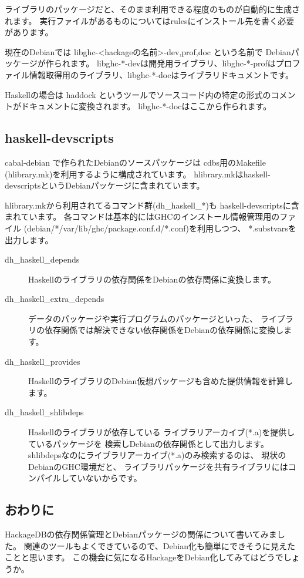 ライブラリのパッケージだと、そのまま利用できる程度のものが自動的に生成されます。
実行ファイルがあるものについてはrulesにインストール先を書く必要があります。

現在のDebianでは libghc-<hackageの名前>-{dev,prof,doc} という名前で Debianパッケージが作られます。
libghc-*-devは開発用ライブラリ、libghc-*-profはプロファイル情報取得用のライブラリ、libghc-*-docはライブラリドキュメントです。

Haskellの場合は haddock というツールでソースコード内の特定の形式のコメントがドキュメントに変換されます。
libghc-*-docはここから作られます。


\subsection{haskell-devscripts}

cabal-debian で作られたDebianのソースパッケージは
cdbs用のMakefile (hlibrary.mk)を利用するように構成されています。
hlibrary.mkはhaskell-devscriptsというDebianパッケージに含まれています。


hlibrary.mkから利用されてるコマンド群(dh\_haskell\_*)も
haskell-devscriptsに含まれています。
各コマンドは基本的にはGHCのインストール情報管理用のファイル
(debian/*/var/lib/ghc/package.conf.d/*.conf)を利用しつつ、
*.substvarsを出力します。

\begin{description}
\item[dh\_haskell\_depends]
Haskellのライブラリの依存関係をDebianの依存関係に変換します。
\item[dh\_haskell\_extra\_depends]
データのパッケージや実行プログラムのパッケージといった、
ライブラリの依存関係では解決できない依存関係をDebianの依存関係に変換します。
\item[dh\_haskell\_provides]
HaskellのライブラリのDebian仮想パッケージも含めた提供情報を計算します。
\item[dh\_haskell\_shlibdeps]
Haskellのライブラリが依存している
ライブラリアーカイブ(*.a)を提供しているパッケージを
検索しDebianの依存関係として出力します。
shlibdepsなのにライブラリアーカイブ(*.a)のみ検索するのは、
現状のDebianのGHC環境だと、
ライブラリパッケージを共有ライブラリにはコンパイルしていないからです。
\end{description}

\subsection{おわりに}

HackageDBの依存関係管理とDebianパッケージの関係について書いてみました。
関連のツールもよくできているので、Debian化も簡単にできそうに見えたことと思います。
この機会に気になるHackageをDebian化してみてはどうでしょうか。

